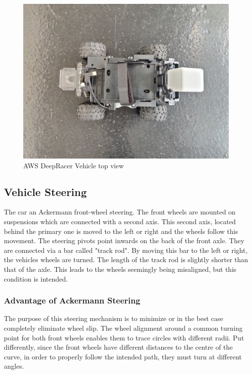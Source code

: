 \begin{figure}
    \centering
    \includegraphics[width=.85\textwidth]{images/car_top_view.jpg}
    \caption{AWS DeepRacer Vehicle top view}
    \label{fig:vehicle_front}
\end{figure}

\subsection{Vehicle Steering}
The car an Ackermann front-wheel steering. The front wheels are mounted on suspensions which are connected with a second axis. This second axis, located behind the primary one is moved to the left or right and the wheels follow this movement. The steering pivots point inwards on the back of the front axle. They are connected via a bar called "track rod". By moving this bar to the left or right, the vehicles wheels are turned. The length of the track rod is slightly shorter than that of the axle. This leads to the wheels seemingly being misaligned, but this condition is intended.

\subsubsection{Advantage of Ackermann Steering}
The purpose of this steering mechanism is to minimize or in the best case completely eliminate wheel slip. The wheel alignment around a common turning point for both front wheels enables them to trace circles with different radii. Put differently, since the front wheels have different distances to the centre of the curve, in order to properly follow the intended path, they must turn at different angles.

